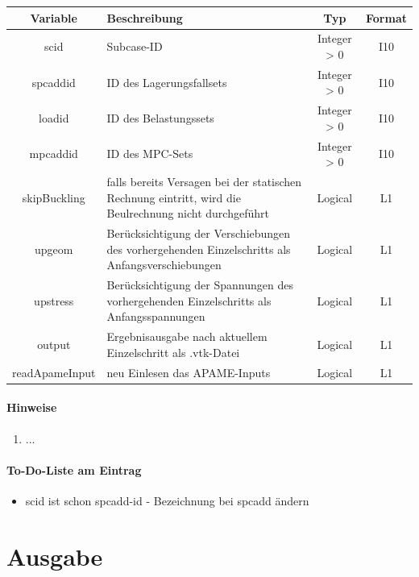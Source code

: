 \documentclass[11pt,titlepage,listof=totoc,bibliography=totoc,twoside]{scrreprt}
\begin{document}
{{\begin{tabularx}{\textwidth}{cXcc}
\toprule
Variable& Beschreibung													& Typ		& Format	\\
\midrule
scid		& Subcase-ID												& Integer > 0	& I10		\\
spcaddid	& ID des Lagerungsfallsets										& Integer > 0	& I10		\\
loadid		& ID des Belastungssets											& Integer > 0	& I10		\\
mpcaddid	& ID des MPC-Sets											& Integer > 0	& I10		\\
skipBuckling   	& falls bereits Versagen bei der statischen Rechnung eintritt, wird die Beulrechnung nicht durchgeführt	& Logical	& L1 		\\
upgeom    	& Berücksichtigung der Verschiebungen des vorhergehenden Einzelschritts als Anfangsverschiebungen 	& Logical	& L1 		\\
upstress  	& Berücksichtigung der Spannungen des vorhergehenden Einzelschritts als Anfangsspannungen 		& Logical 	& L1  		\\
output    	& Ergebnisausgabe nach aktuellem Einzelschritt als {.}vtk-Datei						& Logical 	& L1  		\\
readApameInput 	& neu Einlesen das APAME-Inputs 			 						& Logical 	& L1  		\\
\bottomrule
\end{tabularx}

\subsubsection{Hinweise}

\begin{enumerate}
\item ...
\end{enumerate}

\subsubsection{To-Do-Liste am Eintrag}

\begin{itemize}
\item scid ist schon spcadd-id - Bezeichnung bei spcadd ändern
\end{itemize}

\chapter{Ausgabe}

}}
\end{document}
